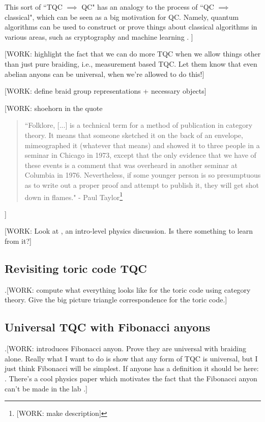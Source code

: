\documentclass{article}
\theoremstyle{definition}
\numberwithin{figure}{section}
\begin{document}
This sort of ``TQC $\implies$ QC" has an analogy to the process of ``QC $\implies$ classical", which can be seen as a big motivation for QC. Namely, quantum algorithms can be used to construct or prove things about classical algorithms in various areas, such as cryptography \cite{regev2009lattices} and machine learning \cite{tang2019quantum}.
]


[WORK: highlight the fact that we can do more TQC when we allow things other than just pure braiding, i.e., measurement based TQC. Let them know that even abelian anyons can be universal, when we're allowed to do this!]

[WORK: define braid group representations + necessary objects]

[WORK: shoehorn in the quote

\begin{quote}
``Folklore, [...] is a technical term for a method of publication in category theory. It means that someone sketched it on the back of an envelope, mimeographed it (whatever that means) and showed it to three people in a seminar in Chicago in 1973, except that the only evidence that we have of these events is a comment that was overheard in another seminar at Columbia in 1976. Nevertheless, if some younger person is so presumptuous as to write out a proper proof and attempt to publish it, they will get shot down in flames." - Paul Taylor\footnote{[WORK: make description]\cite{aubert2019categories}}
\end{quote}

]

[WORK: Look at \cite{lahtinen2017short}, an intro-level physics discussion. Is there something to learn from it?]

\subsection{Revisiting toric code TQC}
\label{Revisiting toric code TQC}

.[WORK: compute what everything looks like for the toric code using category theory. Give the big picture triangle correspondence for the toric code.]


\subsection{Universal TQC with Fibonacci anyons}
\label{Universal TQC with Fibonacci anyons}

.[WORK: introduces Fibonacci anyon. Prove they are universal with braiding alone. Really what I want to do is show that any form of TQC is universal, but I just think Fibonacci will be simplest. If anyone has a definition it should be here: \cite{trebst2008short}. There's a cool physics paper which motivates the fact that the Fibonacci anyon can't be made in the lab \cite{freedman2012galois}.]
\end{document}
